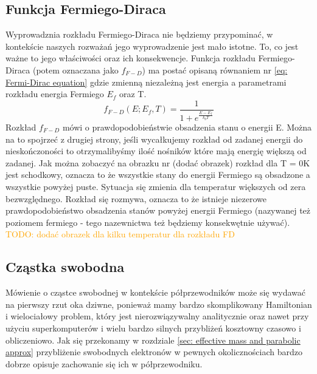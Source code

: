     \subsection{Funkcja Fermiego-Diraca} \label{sec: F-D}
        Wyprowadznia rozkładu Fermiego-Diraca nie będziemy przypominać, w kontekście naszych rozważań jego wyprowadzenie jest mało istotne. To, co jest ważne
        to jego właściwości oraz ich konsekwencje. Funkcja rozkładu Fermiego-Diraca (potem oznaczana jako $f_{F-D}$) ma postać opisaną równaniem nr \ref{eq: Fermi-Dirac equation} gdzie zmienną niezależną
        jest energia a parametrami rozkładu energia Fermiego $E_f$ oraz T. 
        \begin{equation}
            f_{F-D}(E;E_f,T) = \frac{1}{1+e^{\frac{E-E_f}{k_bT}}}
            \label{eq: Fermi-Dirac equation}
        \end{equation}
        Rozkład $f_{F-D}$ mówi o prawdopodobieństwie obsadzenia stanu o energii E. Można na to spojrzeć z drugiej strony, jeśli wycałkujemy rozkład od zadanej energii do nieskończoności to otrzymalibyśmy ilość nośników które mają energię większą 
        od zadanej. Jak można zobaczyć na obrazku nr (dodać obrazek) rozkład dla T = 0K jest schodkowy, oznacza to że wszystkie stany do energii Fermiego są obsadzone a wszystkie powyżej puste. Sytuacja się zmienia dla temperatur większych od zera 
        bezwzględnego. Rozkład się rozmywa, oznacza to że istnieje niezerowe prawdopodobieństwo obsadzenia stanów powyżej energii Fermiego (nazywanej też poziomem fermiego - tego nazewnictwa też będziemy konsekwętnie używać).  \newline\newline
        \noindent \textcolor{orange}{TODO: dodać obrazek dla kilku temperatur dla rozkładu FD}

    \subsection{Cząstka swobodna} \label{sec: free particle}
        Mówienie o cząstce swobodnej w kontekście półprzewodników może się wydawać na pierwszy rzut oka dziwne, ponieważ mamy bardzo skomplikowany Hamiltonian i wielociałowy problem, który jest nierozwiązywalny analitycznie oraz nawet przy użyciu 
        superkomputerów i wielu bardzo silnych przybliżeń kosztowny czasowo i obliczeniowo. Jak się przekonamy w rozdziale \ref{sec: effective mass and parabolic approx} przybliżenie swobodnych elektronów w pewnych okolicznościach bardzo dobrze opisuje 
        zachowanie się ich w półprzewodniku. 

